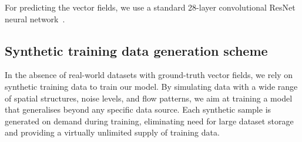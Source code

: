 \documentclass[a4paper,12pt]{article}
\begin{document}
For predicting the vector fields, we use a standard 28-layer convolutional ResNet neural network~\cite{resnet}.

\subsection{Synthetic training data generation scheme}
In the absence of real-world datasets with ground-truth vector fields, we rely on synthetic training data to train our model.
By simulating data with a wide range of spatial structures, noise levels, and flow patterns, we aim at training a model that generalises beyond any specific data source.
Each synthetic sample is generated on demand during training, eliminating need for large dataset storage and providing a virtually unlimited supply of training data.
\end{document}
